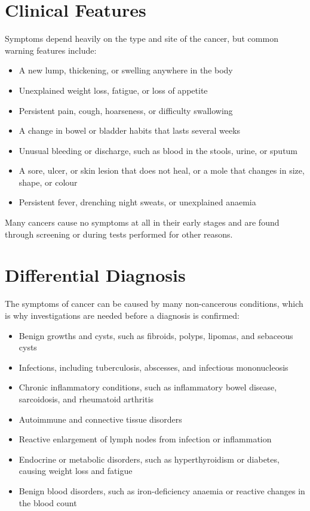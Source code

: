 \section*{Clinical Features}
Symptoms depend heavily on the type and site of the cancer, but common warning features include:
\begin{itemize}
    \item A new lump, thickening, or swelling anywhere in the body
    \item Unexplained weight loss, fatigue, or loss of appetite
    \item Persistent pain, cough, hoarseness, or difficulty swallowing
    \item A change in bowel or bladder habits that lasts several weeks
    \item Unusual bleeding or discharge, such as blood in the stools, urine, or sputum
    \item A sore, ulcer, or skin lesion that does not heal, or a mole that changes in size, shape, or colour
    \item Persistent fever, drenching night sweats, or unexplained anaemia
\end{itemize}
Many cancers cause no symptoms at all in their early stages and are found through screening or during tests performed for other reasons.

\section*{Differential Diagnosis}
The symptoms of cancer can be caused by many non-cancerous conditions, which is why investigations are needed before a diagnosis is confirmed:
\begin{itemize}
    \item Benign growths and cysts, such as fibroids, polyps, lipomas, and sebaceous cysts
    \item Infections, including tuberculosis, abscesses, and infectious mononucleosis
    \item Chronic inflammatory conditions, such as inflammatory bowel disease, sarcoidosis, and rheumatoid arthritis
    \item Autoimmune and connective tissue disorders
    \item Reactive enlargement of lymph nodes from infection or inflammation
    \item Endocrine or metabolic disorders, such as hyperthyroidism or diabetes, causing weight loss and fatigue
    \item Benign blood disorders, such as iron-deficiency anaemia or reactive changes in the blood count
\end{itemize}

